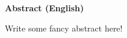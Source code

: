 \begin{center}\Large\bfseries Abstract (English)\end{center}\vspace*{1cm}\noindent 
Write some fancy abstract here!